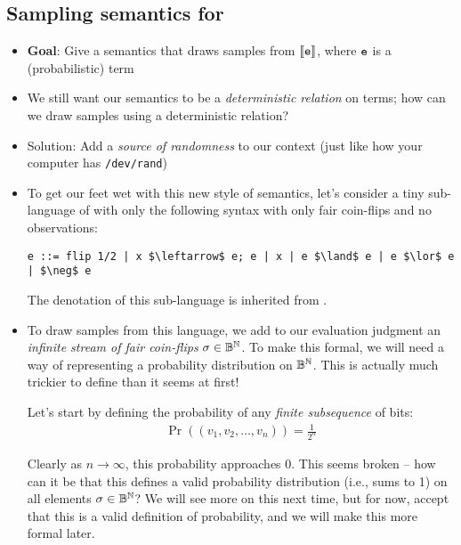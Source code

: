 \documentclass{tufte-handout}
\begin{document}
\subsection{Sampling semantics for \disc{}}
\begin{itemize}
  \item \textbf{Goal}: Give a semantics that draws samples from
  $\left \llbracket {\texttt{e}} \right \rrbracket$, where $\texttt{e}$ is a (probabilistic) \disc{} term

  \item We still want our semantics to be a \emph{deterministic relation} on terms; how can 
  we draw samples using a deterministic relation?

  \item Solution: Add a \emph{source of randomness} to our context (just like how your 
  computer has \texttt{/dev/rand})

  \item To get our feet wet with this new style of semantics, let's consider a
  tiny sub-language of \disc{} with only the following syntax with only fair
  coin-flips and no observations:
\begin{lstlisting}[mathescape=true]
  e ::= flip 1/2 | x $\leftarrow$ e; e | x | e $\land$ e | e $\lor$ e | $\neg$ e
\end{lstlisting}

  The denotation of this sub-language is inherited from \disc{}. 

  \item To draw samples from this language, we add to our evaluation judgment an
  \emph{infinite stream of fair coin-flips} $\sigma \in \mathbb{B}^{\mathbb{N}}$. 
  To make this 
  formal, we will need a way of representing a probability distribution on $\mathbb{B}^{\mathbb{N}}$.
  This is actually much trickier to define than it seems at first! 

  Let's start by defining the probability of any \emph{finite subsequence} of bits:
  \begin{align}
    \Pr((v_1, v_2, \dots, v_n)) = \frac{1}{2^n}
  \end{align}
  
  Clearly as $n \rightarrow \infty$, this probability approaches 0. This seems broken -- 
  how can it be that this defines a valid probability distribution (i.e., sums to 1) on 
  all elements $\sigma \in \mathbb{B}^{\mathbb{N}}$? We will see more on this next time, but for now, 
  accept that this is a valid definition of probability, and we will make this
  more formal later. 


\end{itemize}
\end{document}
